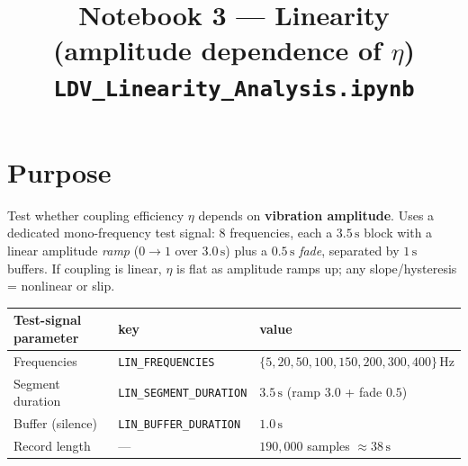 \documentclass[11pt,a4paper]{article}
\title{\vspace{-1.5em}\textbf{Notebook 3 --- Linearity (amplitude dependence of $\eta$)}\\[2pt]
\large \texttt{LDV\_Linearity\_Analysis.ipynb}}
\author{}\date{}
\newcommand{\unit}[1]{\,\mathrm{#1}}
\begin{document}
\maketitle\vspace{-3em}

\section*{Purpose}
Test whether coupling efficiency $\eta$ depends on \textbf{vibration amplitude}. Uses a dedicated
mono-frequency test signal: 8 frequencies, each a $3.5\unit{s}$ block with a linear amplitude
\emph{ramp} ($0\!\to\!1$ over $3.0\unit{s}$) plus a $0.5\unit{s}$ \emph{fade}, separated by $1\unit{s}$
buffers. If coupling is linear, $\eta$ is flat as amplitude ramps up; any slope/hysteresis = nonlinear or slip.

\begin{table}[h]\centering\footnotesize
\begin{tabular}{@{}lll@{}}
\toprule
\textbf{Test-signal parameter} & \textbf{key} & \textbf{value}\\\midrule
Frequencies & \texttt{LIN\_FREQUENCIES} & $\{5,20,50,100,150,200,300,400\}\unit{Hz}$\\
Segment duration & \texttt{LIN\_SEGMENT\_DURATION} & $3.5\unit{s}$ (ramp $3.0$ + fade $0.5$)\\
Buffer (silence) & \texttt{LIN\_BUFFER\_DURATION} & $1.0\unit{s}$\\
Record length & --- & $190{,}000$ samples $\approx 38\unit{s}$\\
\bottomrule
\end{tabular}
\end{table}

\end{document}
